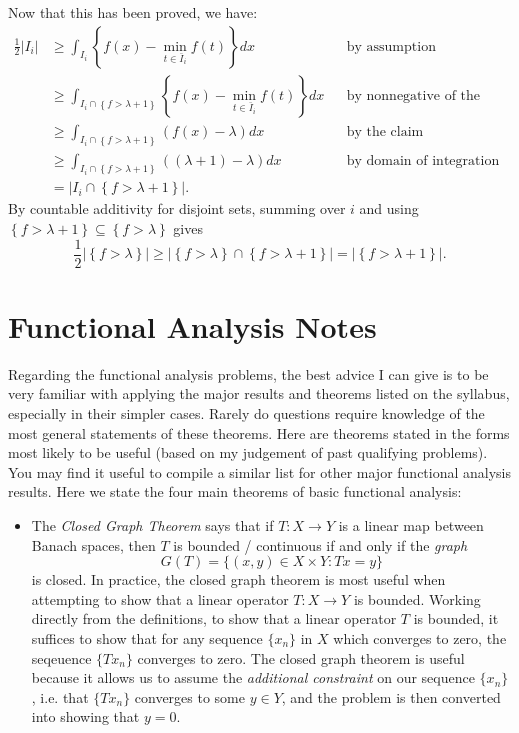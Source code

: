 \documentclass[answers]{exam}
\theoremstyle{problemstyle}
\newcommand{\1}[1]{\textbf{1}_{\left[#1\right]}} %
\begin{document}
\begin{questions}
\begin{solution}
  Now that this has been proved, we have:
  \begin{align*}
    \frac{1}{2}|I_{i}| &\geq \int_{I_{i}} \left\{ f(x)-\min_{t\in {\bar{I}_{i}}}f(t) \right\} dx
    &&\text{by assumption}\\
                       &\geq\int_{I_{i}\cap \left\{ f > \lambda+1 \right\}} \left\{ f(x)-\min_{t\in{\bar{I}_{i}}}f(t) \right\} dx
    &&\text{by nonnegative of the integrand}\\
                       &\geq \int_{I_{i}\cap \left\{ f > \lambda+1 \right\}} (f(x)-\lambda) dx
    &&\text{by the claim}\\
                       &\geq \int_{I_{i}\cap \left\{ f > \lambda+1 \right\}} ((\lambda+1)-\lambda) dx
    &&\text{by domain of integration}\\
                       &= \left|I_{i} \cap \left\{  f> \lambda+1\right\} \right|.
  \end{align*}
  By countable additivity for disjoint sets, summing over $i$ and using $\left\{f>\lambda+1 \right\}\subseteq
 \left\{f>\lambda \right\}$ gives
  \begin{equation*}
    \frac{1}{2}\left| \left\{f >\lambda \right\} \right|  \geq \left| \left\{ f>\lambda \right\}\cap \left\{ f>\lambda+1 \right\} \right| = \left| \left\{ f>\lambda+1 \right\} \right|.
  \end{equation*}
\end{solution}




\newpage
\section{Functional Analysis Notes}

Regarding the functional analysis problems, the best advice I can give is to be very familiar with applying the major results and theorems listed on the syllabus, especially in their simpler cases. Rarely do questions require knowledge of the most general statements of these theorems. Here are theorems stated in the forms most likely to be useful (based on my judgement of past qualifying problems). You may find it useful to compile a similar list for other major functional analysis results. Here we state the four main theorems of basic functional analysis:
%
\begin{itemize}
	\item The \emph{Closed Graph Theorem} says that if $T: X \to Y$ is a linear map between Banach spaces, then $T$ is bounded / continuous if and only if the \emph{graph}
	\[ G(T) = \{ (x,y) \in X \times Y: Tx = y \} \]
	is closed. In practice, the closed graph theorem is most useful when attempting to show that a linear operator $T: X \to Y$ is bounded. Working directly from the definitions, to show that a linear operator $T$ is bounded, it suffices to show that for any sequence $\{ x_n \}$ in $X$ which converges to zero, the seqeuence $\{ Tx_n \}$ converges to zero. The closed graph theorem is useful because it allows us to assume the \emph{additional constraint} on our sequence $\{ x_n \}$, i.e. that $\{ Tx_n \}$ converges to some $y \in Y$, and the problem is then converted into showing that $y = 0$.


\end{itemize}
\end{questions}
\end{document}
